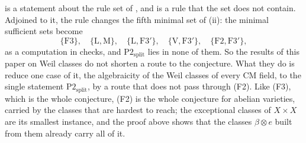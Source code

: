 \begin{remark}\label{rem:f2rule}
 is a statement about the rule set of ,
and  is a rule that the set does not contain. Adjoined to
it, the rule changes the fifth minimal set of (ii): the
minimal sufficient sets become
\[
  \{\mathrm{F3}\},\quad\{\mathrm{L},\mathrm{M}\},\quad
  \{\mathrm{L},\mathrm{F3}'\},\quad\{\mathrm{V},\mathrm{F3}'\},\quad
  \{\mathrm{F2},\mathrm{F3}'\},
\]
as a computation in \cite{BMB26} checks, and
$\mathrm{P2}_{\mathrm{split}}$ lies in none of them. So the results of this
paper on Weil classes do not shorten a route to the conjecture. What they do
is reduce one case of it, the algebraicity of the Weil classes of every CM
field, to the single statement $\mathrm{P2}_{\mathrm{split}}$, by a route that
does not pass through (F2). Like (F3), which is the whole conjecture, (F2) is
the whole conjecture for abelian varieties, carried by the classes that are
hardest to reach; the exceptional classes of $X\times X$ are its smallest
instance, and the proof above shows that the classes $\beta\otimes e$ built
from them already carry all of it.
\end{remark}
